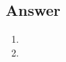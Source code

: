 \documentclass[
	12pt, %
]{../Template/fphw}
\begin{document}

\subsection*{Answer} 

\begin{enumerate}[label = (\arabic*)] 
	\item 
    
	\item 
\end{enumerate}

\end{document}
